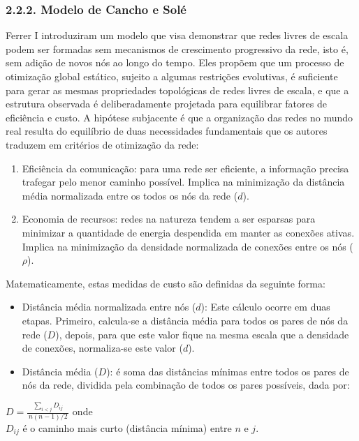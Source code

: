 \documentclass[12pt,oneside,a4paper,brazil,sumario=tradicional]{abntex2}
\begin{document}
\subsubsection*{2.2.2. Modelo de Cancho e Solé}
Ferrer I \textcite{ferrericancho2003} introduziram um modelo que visa demonstrar que redes livres de escala podem ser formadas sem mecanismos de crescimento progressivo da rede, isto é, sem adição de novos nós ao longo do tempo. Eles propõem que um processo de otimização global estático, sujeito a algumas restrições evolutivas, é suficiente para gerar as mesmas propriedades topológicas de redes livres de escala, e que a estrutura observada é deliberadamente projetada para equilibrar fatores de eficiência e custo. A hipótese subjacente é que a organização das redes no mundo real resulta do equilíbrio de duas necessidades fundamentais que os autores traduzem em critérios de otimização da rede:

\begin{enumerate}
  \item Eficiência da comunicação: para uma rede ser eficiente, a informação precisa trafegar pelo menor caminho possível. Implica na minimização da distância média normalizada entre os todos os nós da rede ($d$).
  \item Economia de recursos: redes na natureza tendem a ser esparsas para minimizar a quantidade de energia despendida em manter as conexões ativas. Implica na minimização da densidade normalizada de conexões entre os nós ($\rho$).
\end{enumerate}

Matematicamente, estas medidas de custo são definidas da seguinte forma:

\begin{itemize}
  \item Distância média normalizada entre nós ($d$): Este cálculo ocorre em duas etapas. Primeiro, calcula-se a distância média para todos os pares de nós da rede ($D$), depois, para que este valor fique na mesma escala que a densidade de conexões, normaliza-se este valor ($d$).
  \item Distância média ($D$): é soma das distâncias mínimas entre todos os pares de nós da rede, dividida pela combinação de todos os pares possíveis, dada por:
\end{itemize}

$D = \frac{\sum_{i<j} D_{ij}}{\,n(n-1)/2\,}$ onde \\$D_{ij}$ é o caminho mais curto (distância mínima) entre $n$ e $j$.
\end{document}
